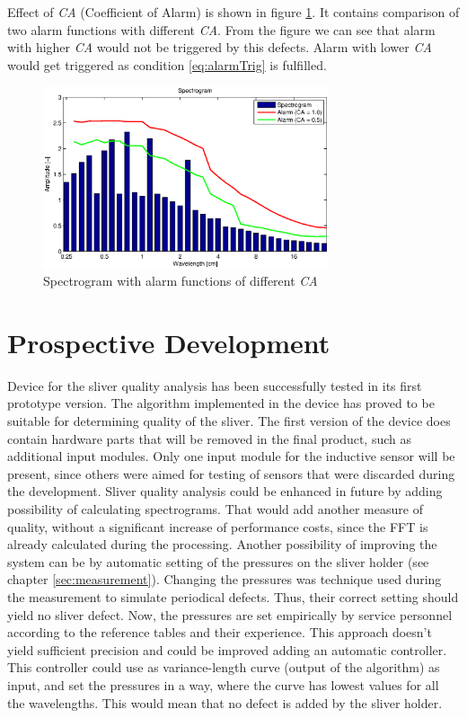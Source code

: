 \documentclass[twoside]{ctuthesis}
\theoremstyle{plain}
\theoremstyle{definition}
\theoremstyle{note}
\begin{document}
Effect of \textit{CA} (Coefficient of Alarm) is shown in figure \ref{fig:alarm2}. It contains comparison of two alarm functions with different \textit{CA}. From the figure we can see that alarm with higher \textit{CA} would not be triggered by this defects. Alarm with lower \textit{CA} would get triggered as condition \ref{eq:alarmTrig} is fulfilled.
\begin{figure}[h]
	\centering
	\includegraphics[width=0.75\textwidth]{moire1_alarm.eps}
	\caption{Spectrogram with alarm functions of different \textit{CA}}
	\label{fig:alarm2}
\end{figure}
\chapter{Prospective Development}
Device for the sliver quality analysis has been successfully tested in its first prototype version. The algorithm implemented in the device has proved to be suitable for determining quality of the sliver. The first version of the device does contain hardware parts that will be removed in the final product, such as additional input modules. Only one input module for the inductive sensor will be present, since others were aimed for testing of sensors that were discarded during the development.
Sliver quality analysis could be enhanced in future by adding possibility of calculating spectrograms. That would add another measure of quality, without a significant increase of performance costs, since the FFT is already calculated during the processing. 
Another possibility of improving the system can be by automatic setting of the pressures on the sliver holder (see chapter \ref{sec:measurement}). Changing the pressures was technique used during the measurement to simulate periodical defects. Thus, their correct setting should yield no sliver defect. Now, the pressures are set empirically by service personnel according to the reference tables and their experience. This approach doesn't yield sufficient precision and could be improved adding an automatic controller. This controller could use as variance-length curve (output of the algorithm) as input, and set the pressures in a way, where the curve has lowest values for all the wavelengths. This would mean that no defect is added by the sliver holder.
\end{document}
